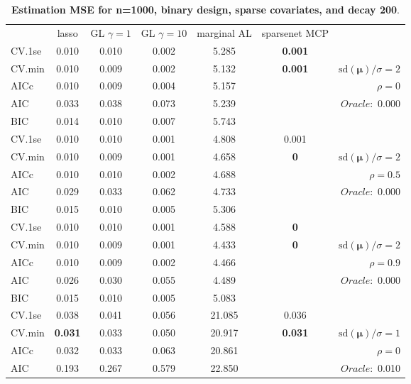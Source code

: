 \clearpage
\begin{table}\vspace{-.5cm}
\caption[l]{ { \bf Estimation MSE for n=1000, binary design, 
sparse covariates, and  decay  200}.}
\vspace{-.5cm}
\footnotesize{}
\begin{center}
\begin{tabular}{l*{5}{c}|r}
& lasso & GL $\gamma=1$ & GL $\gamma=10$ & marginal AL & sparsenet MCP  & \\
 \cline{1-7}
CV.1se & 0.010 & 0.010 & 0.002 & 5.285 & {\bf 0.001} & \\
CV.min & 0.010 & 0.009 & 0.002 & 5.132 & {\bf 0.001} &  $\mathrm{sd}(\mathbf{\mu})/\sigma=2$ \\
AICc & 0.010 & 0.009 & 0.004 & 5.157 & & $\rho=0$ \\
AIC & 0.033 & 0.038 & 0.073 & 5.239 & &  \multirow{2}{*}{$Oracle: $ 0.000} \\
BIC & 0.014 & 0.010 & 0.007 & 5.743 & &  \\
 \hline 
CV.1se & 0.010 & 0.010 & 0.001 & 4.808 & 0.001 & \\
CV.min & 0.010 & 0.009 & 0.001 & 4.658 & {\bf 0} &  $\mathrm{sd}(\mathbf{\mu})/\sigma=2$ \\
AICc & 0.010 & 0.010 & 0.002 & 4.688 & & $\rho=0.5$ \\
AIC & 0.029 & 0.033 & 0.062 & 4.733 & &  \multirow{2}{*}{$Oracle: $ 0.000} \\
BIC & 0.015 & 0.010 & 0.005 & 5.306 & &  \\
 \hline 
CV.1se & 0.010 & 0.010 & 0.001 & 4.588 & {\bf 0} & \\
CV.min & 0.010 & 0.009 & 0.001 & 4.433 & {\bf 0} &  $\mathrm{sd}(\mathbf{\mu})/\sigma=2$ \\
AICc & 0.010 & 0.009 & 0.002 & 4.466 & & $\rho=0.9$ \\
AIC & 0.026 & 0.030 & 0.055 & 4.489 & &  \multirow{2}{*}{$Oracle: $ 0.000} \\
BIC & 0.015 & 0.010 & 0.005 & 5.083 & &  \\
 \hline 
CV.1se & 0.038 & 0.041 & 0.056 & 21.085 & 0.036 & \\
CV.min & {\bf 0.031} & 0.033 & 0.050 & 20.917 & {\bf 0.031} &  $\mathrm{sd}(\mathbf{\mu})/\sigma=1$ \\
AICc & 0.032 & 0.033 & 0.063 & 20.861 & & $\rho=0$ \\
AIC & 0.193 & 0.267 & 0.579 & 22.850 & &  \multirow{2}{*}{$Oracle: $ 0.010} \\

\end{tabular}
\end{center}
\end{table}
